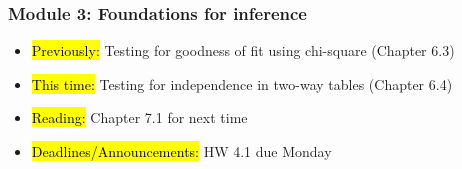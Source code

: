 
\begin{frame}
    \frametitle{Module 3: Foundations for inference}
    \begin{itemize}
        \item \hl{Previously: }Testing for goodness of fit using chi-square (Chapter 6.3)
        \item \hl{This time: }Testing for independence in two-way tables (Chapter 6.4)
        \item \hl{Reading: }Chapter 7.1 for next time
        \item \hl{Deadlines/Announcements: }HW 4.1 due Monday
    \end{itemize}
    
\end{frame}